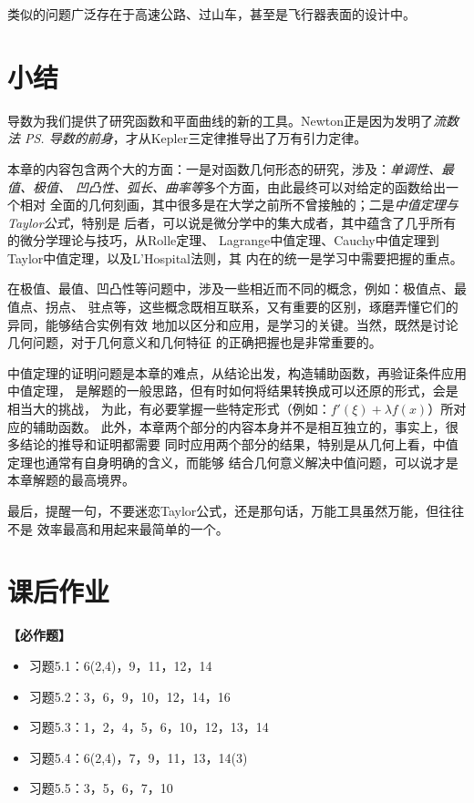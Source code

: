 类似的问题广泛存在于高速公路、过山车，甚至是飞行器表面的设计中。

\section{小结}

导数为我们提供了研究函数和平面曲线的新的工具。Newton正是因为发明了{\it 流数法
\ps{导数的前身}}，才从Kepler三定律推导出了万有引力定律。

本章的内容包含两个大的方面：一是对函数几何形态的研究，涉及：{\it 单调性、最值、极值、
凹凸性、弧长、曲率等}多个方面，由此最终可以对给定的函数给出一个相对
全面的几何刻画，其中很多是在大学之前所不曾接触的；二是{\it 中值定理与Taylor公式}，特别是
后者，可以说是微分学中的集大成者，其中蕴含了几乎所有的微分学理论与技巧，从Rolle定理、
Lagrange中值定理、Cauchy中值定理到Taylor中值定理，以及L'Hospital法则，其
内在的统一是学习中需要把握的重点。

在极值、最值、凹凸性等问题中，涉及一些相近而不同的概念，例如：极值点、最值点、拐点、
驻点等，这些概念既相互联系，又有重要的区别，琢磨弄懂它们的异同，能够结合实例有效
地加以区分和应用，是学习的关键。当然，既然是讨论几何问题，对于几何意义和几何特征
的正确把握也是非常重要的。

中值定理的证明问题是本章的难点，从结论出发，构造辅助函数，再验证条件应用中值定理，
是解题的一般思路，但有时如何将结果转换成可以还原的形式，会是相当大的挑战，
为此，有必要掌握一些特定形式（例如：$f'(\xi)+\lambda f(x)$）所对应的辅助函数。
此外，本章两个部分的内容本身并不是相互独立的，事实上，很多结论的推导和证明都需要
同时应用两个部分的结果，特别是从几何上看，中值定理也通常有自身明确的含义，而能够
结合几何意义解决中值问题，可以说才是本章解题的最高境界。

最后，提醒一句，不要迷恋Taylor公式，还是那句话，万能工具虽然万能，但往往不是
效率最高和用起来最简单的一个。

\newpage

\section*{课后作业}

{\bf 【必作题】}

\begin{itemize}
  \item 习题5.1：6(2,4)，9，11，12，14
  \item 习题5.2：3，6，9，10，12，14，16
  \item 习题5.3：1，2，4，5，6，10，12，13，14
  \item 习题5.4：6(2,4)，7，9，11，13，14(3)
  \item 习题5.5：3，5，6，7，10
\end{itemize}

